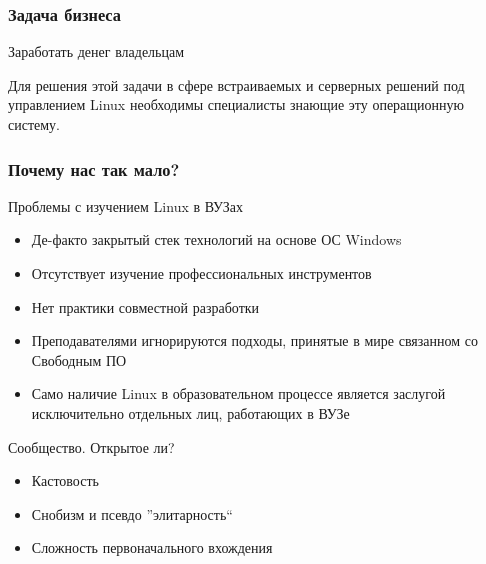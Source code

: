 \begin{frame}
	\frametitle{Задача бизнеса}

	\begin{block}{Заработать денег владельцам}

	Для решения этой задачи в сфере встраиваемых и серверных решений под управлением Linux 
	необходимы специалисты знающие эту операщионную систему.
	\end{block}
\end{frame}



\begin{frame}
	\frametitle{Почему нас так мало?}

	\begin{block}{Проблемы с изучением Linux в ВУЗах}
		\begin{itemize}
			\item Де-факто закрытый стек технологий на основе ОС Windows
			\item Отсутствует изучение профессиональных инструментов
			\item Нет практики совместной разработки
			\item Преподавателями игнорируются подходы, принятые в мире связанном со Свободным ПО
			\item Само наличие Linux в образовательном процессе является 
				заслугой исключительно отдельных лиц, работающих в ВУЗе
		\end{itemize}
	\end{block}

	\pause

	\begin{block}{Сообщество. Открытое ли?}
		\begin{itemize}
			\item Кастовость
			\item Снобизм и псевдо ''элитарность``
			\item Сложность первоначального вхождения
		\end{itemize}
	\end{block}
\end{frame}


